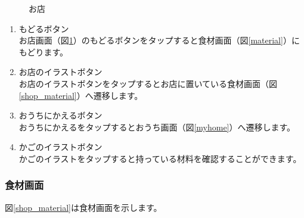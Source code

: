 \documentclass[a4j]{jarticle}
\begin{document}
\begin{figure}[H]
    \begin{center}
    \caption {お店}
    \label{shop}
    \end{center}
\end{figure}

\begin{enumerate}
  \renewcommand{\labelenumi}{\textcircled{\scriptsize \theenumi}}
\item もどるボタン\\
  お店画面（図\ref{shop}）のもどるボタンをタップすると食材画面（図\ref{material}）にもどります。
\item お店のイラストボタン\\
  お店のイラストボタンをタップするとお店に置いている食材画面（図\ref{shop_material}）へ遷移します。
\item おうちにかえるボタン\\
  おうちにかえるをタップするとおうち画面（図\ref{myhome}）へ遷移します。
\item かごのイラストボタン\\
  かごのイラストをタップすると持っている材料を確認することができます。
\end{enumerate}

\newpage
\subsubsection{食材画面}
図\ref{shop_material}は食材画面を示します。\\
\end{document}

